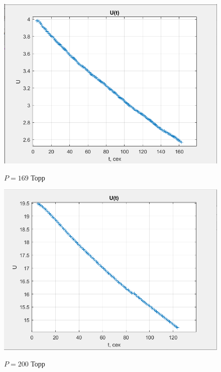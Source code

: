 \documentclass[a4paper, 12pt]{article} %
\begin{document}
\begin{figure}[h]
    \centering
    \includegraphics[width = 10.5 cm]{1gr169}
    \label{fig:vac}
    
    \begin{center}
        \caption{$P = 169$ Торр}
    \end{center}
\end{figure} 

\begin{figure}[h]
    \centering
    \includegraphics[width = 10.5 cm]{1gr200}
    \label{fig:vac}
    
    \begin{center}
        \caption{$P = 200$ Торр}
    \end{center}
\end{figure} 
\end{document}
